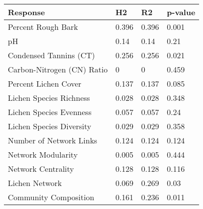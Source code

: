 \begin{table}[ht]
\centering
\begin{tabular}{llll}
  \hline
Response & H2 & R2 & p-value \\ 
  \hline
Percent Rough Bark & 0.396 & 0.396 & 0.001 \\ 
  pH & 0.14 & 0.14 & 0.21 \\ 
  Condensed Tannins (CT) & 0.256 & 0.256 & 0.021 \\ 
  Carbon-Nitrogen (CN) Ratio & 0 & 0 & 0.459 \\ 
  Percent Lichen Cover & 0.137 & 0.137 & 0.085 \\ 
  Lichen Species Richness & 0.028 & 0.028 & 0.348 \\ 
  Lichen Species Evenness & 0.057 & 0.057 & 0.24 \\ 
  Lichen Species Diversity & 0.029 & 0.029 & 0.358 \\ 
  Number of Network Links & 0.124 & 0.124 & 0.124 \\ 
  Network Modularity & 0.005 & 0.005 & 0.444 \\ 
  Network Centrality & 0.128 & 0.128 & 0.116 \\ 
  Lichen Network & 0.069 & 0.269 & 0.03 \\ 
  Community Composition & 0.161 & 0.236 & 0.011 \\ 
   \hline
\end{tabular}
\end{table}
